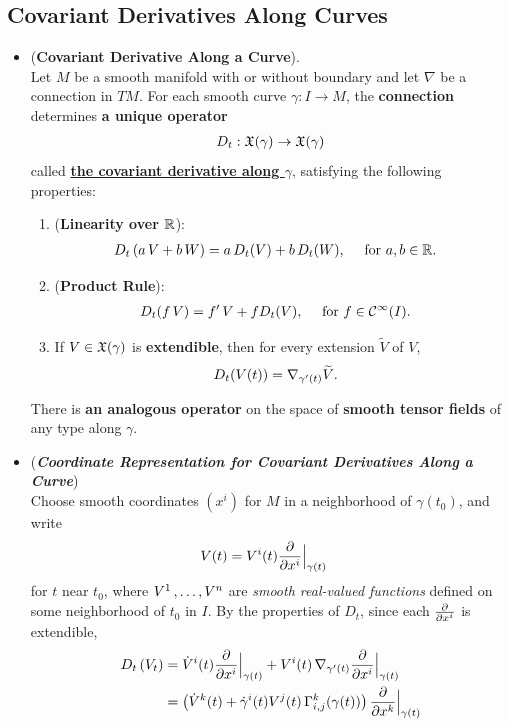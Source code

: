 \documentclass[11pt]{article}
\begin{document}
\subsection{Covariant Derivatives Along Curves}
\begin{itemize}
\item \begin{theorem} (\textbf{Covariant Derivative Along a Curve}). \\
Let $M$ be a smooth manifold with or without boundary and let $\nabla$ be a connection in $TM$. For each smooth curve $\gamma: I \rightarrow M$, the \textbf{connection} determines \textbf{a unique operator} 
\begin{align*}
D_t: {\mathfrak X}(\gamma) \rightarrow {\mathfrak X}(\gamma)
\end{align*} called \underline{\textbf{the covariant derivative along $\gamma$}}, satisfying the following properties:
\begin{enumerate}
\item (\textbf{Linearity over ${\mathbb R}$}):
\begin{align*}
D_t\left(a\,V + b\,W\right) &= a\,D_t(V) + b\,D_t(W), \quad \text{ for }a,b \in {\mathbb R}.
\end{align*}
\item (\textbf{Product Rule}):
\begin{align*}
D_t(f\,V) &= f'\,V + f D_t(V), \quad \text{ for }f \in {\mathcal C}^{\infty}(I).
\end{align*}
\item If $V \in {\mathfrak X}(\gamma)$ is \textbf{extendible}, then for every extension $\widetilde{V}$ of $V$,
\begin{align*}
D_t(V(t)) &= \nabla_{\gamma'(t)}{\widetilde{V}}.
\end{align*}
\end{enumerate} There is \textbf{an analogous operator} on the space of \textbf{smooth tensor fields} of any type along $\gamma$.
\end{theorem}


\item \begin{remark} (\emph{\textbf{Coordinate Representation for Covariant Derivatives Along a Curve}})\\
Choose smooth coordinates $(x^i)$ for $M$ in a neighborhood of $\gamma(t_0)$, and write
\begin{align*}
V(t) &=  V^{i}(t) \frac{\partial }{ \partial x^i}\Bigr|_{\gamma(t)}
\end{align*} for $t$ near $t_0$, where $V^1 \,{,}\ldots{,}\, V^n$ are \emph{smooth real-valued functions} defined on some neighborhood of $t_0$ in $I$. By the properties of $D_t$, since each $\frac{\partial }{ \partial x^i}$ is extendible,
\begin{align}
D_t\left(V_t\right) &= \dot{V}^i(t) \frac{\partial }{ \partial x^i}\Bigr|_{\gamma(t)} + V^i(t)\, \nabla_{\gamma'(t)}{\frac{\partial }{ \partial x^i}\Bigr|_{\gamma(t)}} \nonumber\\
&= \left(\dot{V}^k(t)  + \dot{\gamma}^{i}(t)V^j(t)\,\Gamma_{i,j}^{k}(\gamma(t))\right)\frac{\partial }{ \partial x^k}\Bigr|_{\gamma(t)} \label{eqn: covariant_derivative_along_curve_represent}
\end{align}
\end{remark}


\end{itemize}
\end{document}
